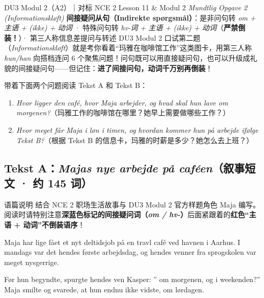 {DU3 Modul 2（A2）｜对标 NCE 2 Lesson 11 \& Modul 2 \textit{Mundtlig Opgave 2 (Informationskløft)}}
{\textbf{间接疑问从句（Indirekte spørgsmål）}：是非问句转 \textit{om + 主语 + (ikke) + 动词} · 特殊问句转 \textit{hv-词 + 主语 + (ikke) + 动词}（\textbf{严禁倒装！}）· 第三人称信息差提问与转述}
{DU3 Modul 2 口试第二题（\textit{Informationskløft}）就是考你看着“玛雅在咖啡馆工作”这类图卡，用第三人称 \textit{hun/han} 向搭档连问 6 个聚焦问题！问句既可以用直接疑问句，也可以升级成礼貌的间接疑问句——但记住：\textbf{进了间接问句，动词千万别再倒装}！}

\begin{foerduleaeser}
带着下面两个问题阅读 Tekst A 和 Tekst B：
\begin{enumerate}
  \item \textit{Hvor ligger den café, hvor Maja arbejder, og hvad skal hun lave om morgenen?}（玛雅工作的咖啡馆在哪里？她早上需要做哪些工作？）
  \item \textit{Hvor meget får Maja i løn i timen, og hvordan kommer hun på arbejde ifølge Tekst B?}（根据 Tekst B 的信息卡，玛雅的时薪是多少？她怎么去上班？）
\end{enumerate}
\end{foerduleaeser}


\subsection*{Tekst A：\textit{Majas nye arbejde på caféen}（叙事短文 · 约 145 词）}

\begin{tipbox}{语篇说明}
结合 NCE 2 职场生活故事与 DU3 Modul 2 官方样题角色 Maja 编写。阅读时请特别注意\textbf{\color{NCDNavy}深蓝色标记的间接疑问词（\textit{om / hv-}）}后面紧跟着的\textbf{\color{NCDRed}红色“主语 + 动词”不倒装语序}！
\end{tipbox}

Maja har lige fået et nyt deltidsjob på en travl café ved havnen i Aarhus. I mandags var det hendes første arbejdsdag, og hendes venner fra sprogskolen var meget nysgerrige.

Før hun begyndte, spurgte hendes ven Kasper: ”  om morgenen, og   i weekenden?” Maja smilte og svarede, at hun endnu ikke vidste,   om lørdagen.

